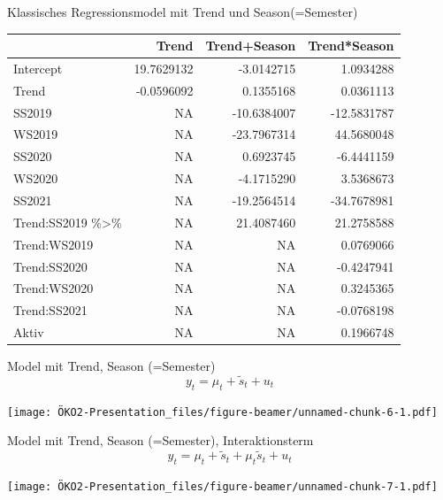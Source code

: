 \documentclass[
  ignorenonframetext,
]{beamer}
\begin{document}
\begin{frame}
\begin{block}{Klassisches Regressionsmodel mit Trend und
Season(=Semester)}
\protect\hypertarget{klassisches-regressionsmodel-mit-trend-und-seasonsemester}{}
\begin{longtable}[]{@{}lrrr@{}}
\toprule
& Trend & Trend+Season & Trend*Season \\
\midrule
\endhead
Intercept & 19.7629132 & -3.0142715 & 1.0934288 \\
Trend & -0.0596092 & 0.1355168 & 0.0361113 \\
SS2019 & NA & -10.6384007 & -12.5831787 \\
WS2019 & NA & -23.7967314 & 44.5680048 \\
SS2020 & NA & 0.6923745 & -6.4441159 \\
WS2020 & NA & -4.1715290 & 3.5368673 \\
SS2021 & NA & -19.2564514 & -34.7678981 \\
Trend:SS2019 \%\textgreater\% & NA & 21.4087460 & 21.2758588 \\
Trend:WS2019 & NA & NA & 0.0769066 \\
Trend:SS2020 & NA & NA & -0.4247941 \\
Trend:WS2020 & NA & NA & 0.3245365 \\
Trend:SS2021 & NA & NA & -0.0768198 \\
Aktiv & NA & NA & 0.1966748 \\
\bottomrule
\end{longtable}
\end{block}
\end{frame}

\begin{frame}
\begin{block}{Model mit Trend, Season (=Semester)}
\protect\hypertarget{model-mit-trend-season-semester}{}
\[y_{t}=\mu_{t}+\tilde{s}_{t}+u_{t}\]

\texttt{[image: ÖKO2-Presentation\_files/figure-beamer/unnamed-chunk-6-1.pdf]}
\end{block}
\end{frame}

\begin{frame}
\begin{block}{Model mit Trend, Season (=Semester), Interaktionsterm}
\protect\hypertarget{model-mit-trend-season-semester-interaktionsterm}{}
\[y_{t}=\mu_{t}+\tilde{s}_{t}+\mu_{t}\tilde{s}_{t}+u_{t}\]

\texttt{[image: ÖKO2-Presentation\_files/figure-beamer/unnamed-chunk-7-1.pdf]}
\end{block}
\end{frame}
\end{document}
